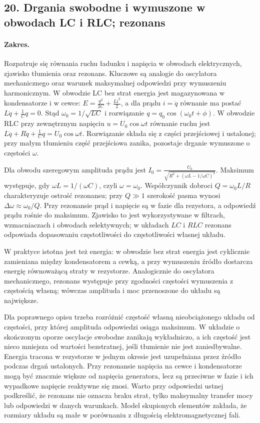 \documentclass[11pt,a4paper]{article}
\begin{document}
\subsection{20. Drgania swobodne i wymuszone w obwodach LC i RLC; rezonans}
\paragraph{Zakres.} Rozpatruje się równania ruchu ładunku i napięcia w obwodach elektrycznych, zjawisko tłumienia oraz rezonans. Kluczowe są analogie do oscylatora mechanicznego oraz warunek maksymalnej odpowiedzi przy wymuszeniu harmonicznym. W obwodzie LC bez strat energia jest magazynowana w kondensatorze i w cewce: $E=\frac{q^2}{2C}+\frac{Li^2}{2}$, a dla prądu $i=\dot q$ równanie ma postać $L\ddot q+\frac{1}{C}q=0$. Stąd $\omega_0=1/\sqrt{LC}$ i rozwiązanie $q=q_0\cos(\omega_0 t+\phi)$. W obwodzie RLC przy zewnętrznym napięciu $u=U_0\cos\omega t$ równanie ruchu jest $L\ddot q+R\dot q+\frac{1}{C}q = U_0\cos\omega t$. Rozwiązanie składa się z części przejściowej i ustalonej; przy małym tłumieniu część przejściowa zanika, pozostaje drganie wymuszone o częstości $\omega$.\par
Dla obwodu szeregowym amplituda prądu jest $I_0=\frac{U_0}{\sqrt{R^2+(\omega L-1/\omega C)^2}}$. Maksimum występuje, gdy $\omega L=1/(\omega C)$, czyli $\omega=\omega_0$. Współczynnik dobroci $Q=\omega_0 L/R$ charakteryzuje ostrość rezonansu; przy $Q\gg1$ szerokość pasma wynosi $\Delta\omega\approx\omega_0/Q$. Przy rezonansie prąd i napięcie są w fazie dla rezystora, a odpowiedź prądu rośnie do maksimum. Zjawisko to jest wykorzystywane w filtrach, wzmacniaczach i obwodach selektywnych; w układach $LC$ i $RLC$ rezonans odpowiada dopasowaniu częstotliwości do częstotliwości własnej układu.\par
W praktyce istotna jest też energia: w obwodzie bez strat energia jest cyklicznie zamieniana między kondensatorem a cewką, a przy wymuszeniu źródło dostarcza energię równoważącą straty w rezystorze. Analogicznie do oscylatora mechanicznego, rezonans występuje przy zgodności częstości wymuszenia z częstością własną; wówczas amplituda i moc przenoszone do układu są największe.\par

Dla poprawnego opisu trzeba rozróżnić częstość własną nieobciążonego układu od częstości, przy której amplituda odpowiedzi osiąga maksimum. W układzie o skończonym oporze oscylacje swobodne zanikają wykładniczo, a ich częstość jest nieco mniejsza od wartości bezstratnej, jeśli tłumienie nie jest zaniedbywalne. Energia tracona w rezystorze w jednym okresie jest uzupełniana przez źródło podczas drgań ustalonych. Przy rezonansie napięcia na cewce i kondensatorze mogą być znacznie większe od napięcia generatora, lecz są przeciwne w fazie i ich wypadkowe napięcie reaktywne się znosi. Warto przy odpowiedzi ustnej podkreślić, że rezonans nie oznacza braku strat, tylko maksymalny transfer mocy lub odpowiedzi w danych warunkach. Model skupionych elementów zakłada, że rozmiary układu są małe w porównaniu z długością elektromagnetycznej fali.
\par
\end{document}
